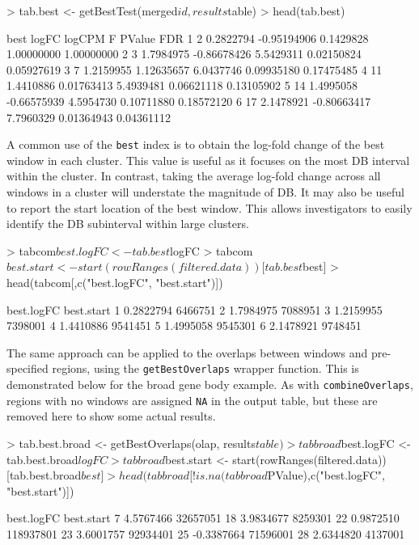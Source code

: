 \documentclass[12pt]{report}
\renewenvironment{Schunk}{\vspace{0pt}}{\vspace{0pt}}
\newcommand{\code}[1]{{\small\texttt{#1}}}
\begin{document}
\begin{Schunk}
\begin{Sinput}
> tab.best <- getBestTest(merged$id, results$table)
> head(tab.best)
\end{Sinput}
\begin{Soutput}
  best     logFC      logCPM         F     PValue        FDR
1    2 0.2822794 -0.95194906 0.1429828 1.00000000 1.00000000
2    3 1.7984975 -0.86678426 5.5429311 0.02150824 0.05927619
3    7 1.2159955  1.12635657 6.0437746 0.09935180 0.17475485
4   11 1.4410886  0.01763413 5.4939481 0.06621118 0.13105902
5   14 1.4995058 -0.66575939 4.5954730 0.10711880 0.18572120
6   17 2.1478921 -0.80663417 7.7960329 0.01364943 0.04361112
\end{Soutput}
\end{Schunk}

A common use of the \code{best} index is to obtain the log-fold change of the best window in each cluster.
This value is useful as it focuses on the most DB interval within the cluster.
In contrast, taking the average log-fold change across all windows in a cluster will understate the magnitude of DB.
It may also be useful to report the start location of the best window.
This allows investigators to easily identify the DB subinterval within large clusters.

\begin{Schunk}
\begin{Sinput}
> tabcom$best.logFC <- tab.best$logFC
> tabcom$best.start <- start(rowRanges(filtered.data))[tab.best$best]
> head(tabcom[,c("best.logFC", "best.start")])
\end{Sinput}
\begin{Soutput}
  best.logFC best.start
1  0.2822794    6466751
2  1.7984975    7088951
3  1.2159955    7398001
4  1.4410886    9541451
5  1.4995058    9545301
6  2.1478921    9748451
\end{Soutput}
\end{Schunk}

The same approach can be applied to the overlaps between windows and pre-specified regions, using the \code{getBestOverlaps} wrapper function.
This is demonstrated below for the broad gene body example.
As with \code{combineOverlaps}, regions with no windows are assigned \code{NA} in the output table, but these are removed here to show some actual results.

\begin{Schunk}
\begin{Sinput}
> tab.best.broad <- getBestOverlaps(olap, results$table)
> tabbroad$best.logFC <- tab.best.broad$logFC
> tabbroad$best.start <- start(rowRanges(filtered.data))[tab.best.broad$best]
> head(tabbroad[!is.na(tabbroad$PValue),c("best.logFC", "best.start")])
\end{Sinput}
\begin{Soutput}
   best.logFC best.start
7   4.5767466   32657051
18  3.9834677    8259301
22  0.9872510  118937801
23  3.6001757   92934401
25 -0.3387664   71596001
28  2.6344820    4137001
\end{Soutput}
\end{Schunk}
\end{document}
